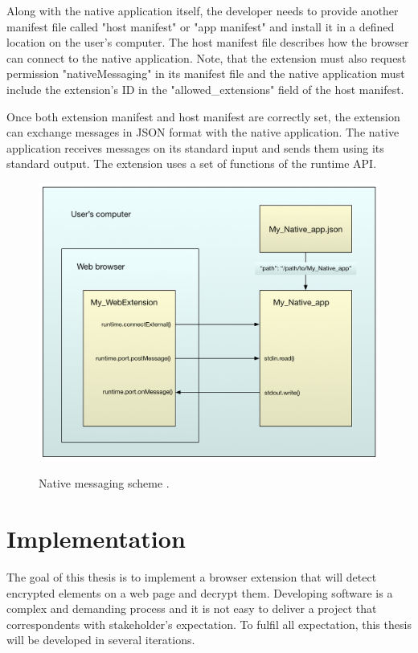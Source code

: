 Along with the native application itself, the developer needs to provide another manifest file called "host manifest" or "app manifest" and install it in a defined location on the user's computer. The host manifest file describes how the browser can connect to the native application. Note, that the extension must also request permission "nativeMessaging" in its manifest file and the native application must include the extension's ID in the "allowed\_extensions" field of the host manifest. \cite{extensionNativeMessaging}

Once both extension manifest and host manifest are correctly set, the extension can exchange messages in JSON format with the native application. The native application receives messages on its standard input and sends them using its standard output. The extension uses a set of functions of the runtime API. \cite{extensionNativeMessaging}

\begin{figure}[H]
    \begin{center}
        \label{img:extensionAnatomy}
        \includegraphics[width=1.0\textwidth]{obrazky-figures/native-messaging.png}
        \caption{Native messaging scheme \cite{extensionNativeMessaging}.}
    \end{center}
\end{figure}

\chapter{Implementation}
The goal of this thesis is to implement a browser extension that will detect encrypted elements on a web page and decrypt them. Developing software is a complex and demanding process and it is not easy to deliver a project that correspondents with stakeholder's expectation. To fulfil all expectation, this thesis will be developed in several iterations.

